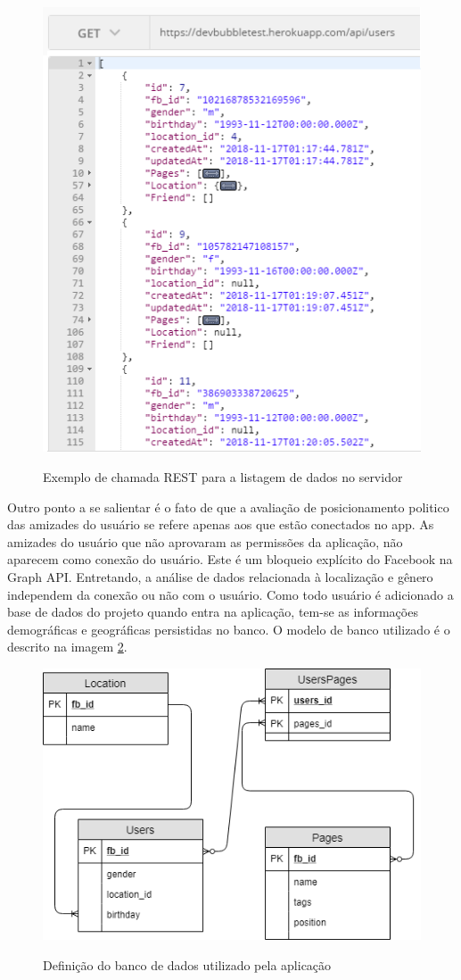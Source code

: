 \documentclass[
	12pt,				%
	oneside,			%
	a4paper,			%
	english,			%
	brazil				%
	]{abntex2ppgsi}
\begin{document}
\begin{figure}[H]
	\centering
	\caption{Exemplo de chamada REST para a listagem de dados no servidor}
	\includegraphics[scale=0.7]{figura2.png}
	\label{fig:figura2}
\end{figure}

Outro ponto a se salientar é o fato de que a avaliação de posicionamento politico das amizades do usuário se refere apenas aos que estão conectados no app. As amizades do usuário que não aprovaram as permissões da aplicação, não aparecem como conexão do usuário. Este é um bloqueio explícito do Facebook na Graph API. Entretando, a análise de dados relacionada à localização e gênero independem da conexão ou não com o usuário. Como todo usuário é adicionado a base de dados do projeto quando entra na aplicação, tem-se as informações demográficas e geográficas persistidas no banco. O modelo de banco utilizado é o descrito na imagem \ref{fig:bancoDeDados}.

\begin{figure}[H]
	\centering
	\caption{Definição do banco de dados utilizado pela aplicação}
	\includegraphics[scale=0.7]{banco_de_dados.png}
	\label{fig:bancoDeDados}
\end{figure}
\end{document}
